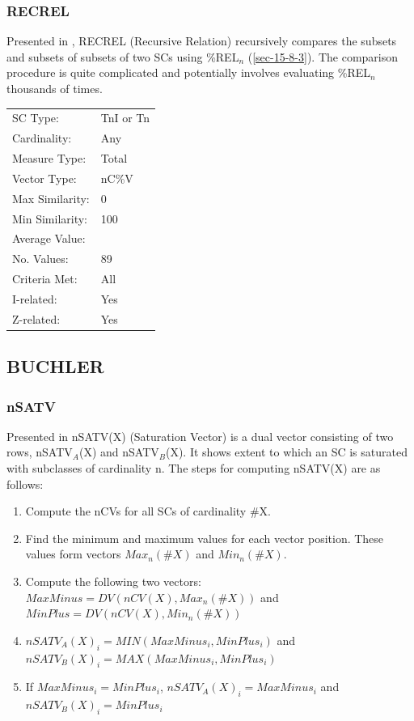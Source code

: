 \documentclass{article}
\begin{document}
\subsubsection{RECREL}
\label{sec-15-8-5}

Presented in \citet{Castren1994}, RECREL (Recursive Relation)
recursively compares the subsets and subsets of subsets of two SCs
using \%REL$_{n}$ (\ref{sec-15-8-3}). The comparison procedure is quite
complicated and potentially involves evaluating \%REL$_{n}$ thousands of
times.

\begin{center}
\begin{tabular}{ll}
 SC Type:         &  TnI or Tn  \\
 Cardinality:     &  Any        \\
 Measure Type:    &  Total      \\
 Vector Type:     &  nC\%V      \\
 Max Similarity:  &  0          \\
 Min Similarity:  &  100        \\
 Average Value:   &             \\
 No. Values:      &  89         \\
 Criteria Met:    &  All        \\
 I-related:       &  Yes        \\
 Z-related:       &  Yes        \\
\end{tabular}
\end{center}
\subsection{BUCHLER}
\label{sec-15-9}
\subsubsection{nSATV}
\label{sec-15-9-1}

Presented in \citet[chap. 2.3]{Buchler1997} nSATV(X) (Saturation
Vector) is a dual vector consisting of two rows, nSATV$_{A}$(X) and
nSATV$_{B}$(X). It shows extent to which an SC is saturated with
subclasses of cardinality n. The steps for computing nSATV(X) are
as follows:

\begin{enumerate}
\item Compute the nCVs for all SCs of cardinality \#X.
\item Find the minimum and maximum values for each vector position. These
   values form vectors $Max_{n}(\#X)$ and $Min_{n}(\#X)$.
\item Compute the following two vectors:
   $MaxMinus=DV(nCV(X),Max_{n}(\#X))$ and $MinPlus=DV(nCV(X),Min_{n}(\#X))$
\item $nSATV_{A}(X)_{i}=MIN(MaxMinus_{i},MinPlus_{i})$ and
   $nSATV_{B}(X)_{i}=MAX(MaxMinus_{i},MinPlus_{i})$
\item If $MaxMinus_{i}=MinPlus_{i}$, $nSATV_{A}(X)_{i}=MaxMinus_{i}$
   and $nSATV_{B}(X)_{i}=MinPlus_{i}$
\end{enumerate}
\end{document}
